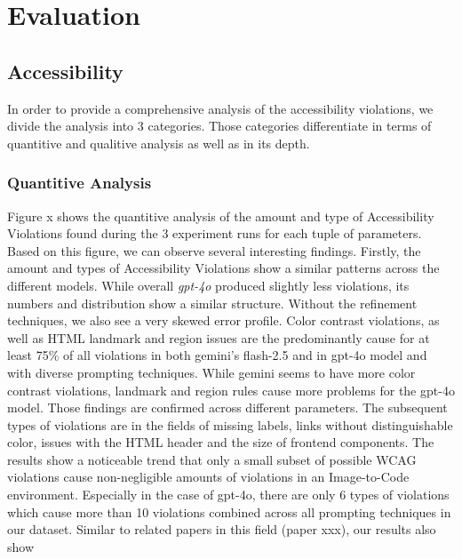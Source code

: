 \chapter{Evaluation}\label{chapter:Evaluation}


\section{Accessibility}
In order to provide a comprehensive analysis of the accessibility violations, 
we divide the analysis into 3 categories. Those categories differentiate in 
terms of quantitive and qualitive analysis as well as in its depth.

\subsection{Quantitive Analysis}
Figure x shows the quantitive analysis of the amount and type of Accessibility 
Violations found during the 3 experiment runs for each tuple of parameters.
Based on this figure, we can observe several interesting findings.\newline
Firstly, the amount and types of Accessibility Violations show a similar 
patterns across the different models. While overall \textit{gpt-4o} produced
slightly less violations, its numbers and distribution show a similar 
structure. 
Without the refinement techniques, we also see a very skewed error profile. 
Color contrast violations, as well as HTML landmark and region 
issues are the predominantly cause for at least 75\% of all violations in both
gemini's flash-2.5 and in gpt-4o model and with diverse prompting techniques.\newline
While gemini seems to have more color contrast violations, 
landmark and region rules cause more problems for the gpt-4o model. Those 
findings are confirmed across different parameters.\newline
The subsequent types of violations are in the fields of missing labels,
links without distinguishable color, issues with the HTML header and 
the size of frontend components. The results show a noticeable trend that 
only a small subset of possible WCAG violations cause non-negligible amounts 
of violations in an Image-to-Code environment. Especially in the case of 
gpt-4o, there are only 6 types of violations which cause more than 10
violations combined across all prompting techniques in our dataset.\newline
Similar to related papers in this field (paper xxx), our results also show 
